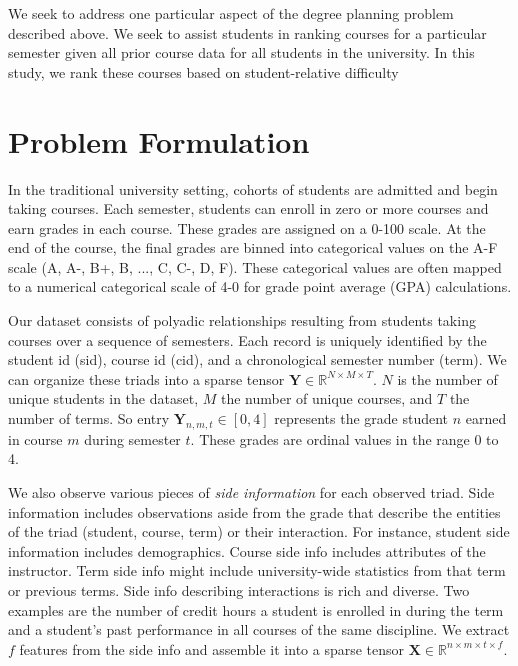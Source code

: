 \documentclass[10pt]{proc}
\begin{document}
We seek to address one particular aspect of the degree planning problem
described above. We seek to assist students in ranking courses for a particular
semester given all prior course data for all students in the university. In this
study, we rank these courses based on student-relative difficulty

\section{Problem Formulation}\label{problem-formulation}

In the traditional university setting, cohorts of students are admitted and
begin taking courses. Each semester, students can enroll in zero or more courses
and earn grades in each course. These grades are assigned on a 0-100 scale. At
the end of the course, the final grades are binned into categorical values on
the A-F scale (A, A-, B+, B, ..., C, C-, D, F). These categorical values are
often mapped to a numerical categorical scale of 4-0 for grade point average
(GPA) calculations.

Our dataset consists of polyadic relationships resulting from students taking
courses over a sequence of semesters. Each record is uniquely identified by the
student id (sid), course id (cid), and a chronological semester number (term).
We can organize these triads into a sparse tensor $\bm{Y} \in \mathbb{R}^{N
\times M \times T}$. $N$ is the number of unique students in the dataset,
$M$ the number of unique courses, and $T$ the number of terms. So entry
$\bm{Y}_{n,m,t} \in [0, 4]$ represents the grade student $n$ earned in course
$m$ during semester $t$. These grades are ordinal values in the range 0 to 4.

We also observe various pieces of \textit{side information} for each observed triad.
Side information includes observations aside from the grade that describe the
entities of the triad (student, course, term) or their interaction.  For
instance, student side information includes demographics. Course side info
includes attributes of the instructor. Term side info might include
university-wide statistics from that term or previous terms. Side info
describing interactions is rich and diverse. Two examples are the number of
credit hours a student is enrolled in during the term and a student's past
performance in all courses of the same discipline. We extract $f$ features from
the side info and assemble it into a sparse tensor $\bm{X} \in \mathbb{R}^{n
\times m \times t \times f}$.
\end{document}
